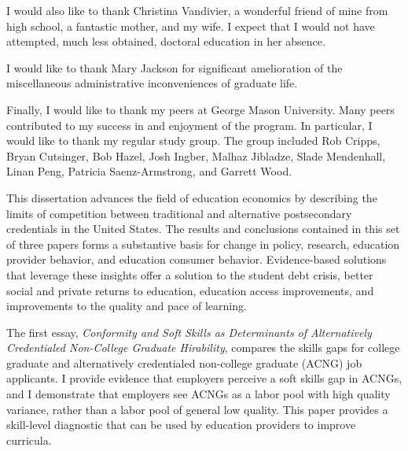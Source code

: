 \documentclass[11 pt]{report}
\begin{document}
\bigskip

\noindent I would also like to thank Christina Vandivier,
a wonderful friend of mine from high school,
a fantastic mother,
and my wife.
I expect that I would not have attempted, much less obtained, doctoral education in her absence.

\bigskip

\noindent I would like to thank Mary Jackson for significant amelioration of the miscellaneous administrative inconveniences of graduate life.

\bigskip

\noindent Finally, I would like to thank my peers at George Mason University.
Many peers contributed to my success in and enjoyment of the program.
In particular, I would like to thank my regular study group.
The group included Rob Cripps, Bryan Cutsinger, Bob Hazel, Josh Ingber, Malhaz Jibladze, Slade Mendenhall,
Linan Peng, Patricia Saenz-Armstrong, and Garrett Wood.



\tableofcontents
\listoftables
\listoffigures


\abstractpage

This dissertation advances the field of education economics by describing the limits of competition between traditional and alternative postsecondary credentials in the United States. The results and conclusions contained in this set of three papers forms a substantive basis for change in policy, research, education provider behavior, and education consumer behavior. Evidence-based solutions that leverage these insights offer a solution to the student debt crisis, better social and private returns to education, education access improvements, and improvements to the quality and pace of learning.

The first essay,
\textit{Conformity and Soft Skills as Determinants of Alternatively Credentialed Non-College Graduate Hirability},
compares the skills gaps for college graduate and alternatively credentialed non-college graduate (ACNG) job applicants. I provide evidence that employers perceive a soft skills gap in ACNGs, and I demonstrate that employers see ACNGs as a labor pool with high quality variance, rather than a labor pool of general low quality. This paper provides a skill-level diagnostic that can be used by education providers to improve curricula.
\end{document}
